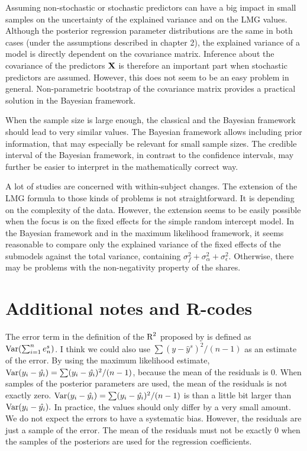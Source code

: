 \documentclass[11pt,a4paper,twoside]{book}\usepackage[]{graphicx}\usepackage[]{color}
\begin{document}
Assuming non-stochastic or stochastic predictors can have a big impact in small samples on the uncertainty of the explained variance and on the LMG values. Although the posterior regression parameter distributions are the same in both cases (under the assumptions described in chapter 2), the explained variance of a model is directly dependent on the covariance matrix. Inference about the covariance of the predictors ${\mathbf{X}}$ is therefore an important part when stochastic predictors are assumed. However, this does not seem to be an easy problem in general. Non-parametric bootstrap of the covariance matrix provides a practical solution in the Bayesian framework. 

 When the sample size is large enough, the classical and the Bayesian framework should lead to very similar values. The Bayesian framework allows including prior information, that may especially be relevant for small sample sizes. The credible interval of the Bayesian framework, in contrast to the confidence intervals, may further be easier to interpret in the mathematically correct way.
 
A lot of studies are concerned with within-subject changes. The extension of the LMG formula to those kinds of problems is not straightforward. It is depending on the complexity of the data. However, the extension seems to be easily possible when the focus is on the fixed effects for the simple random intercept model. In the Bayesian framework and in the maximum likelihood framework, it seems reasonable to compare only the explained variance of the fixed effects of the submodels against the total variance, containing $\sigma_{f}^2 + \sigma_{\alpha}^2 + \sigma_{\epsilon}^2$. Otherwise, there may be problems with the non-negativity property of the shares. 









\cleardoublepage

\appendix


\chapter{Additional notes and R-codes}

The error term in the definition of the $\text{R}^2$ proposed by \cite{Gelman2017} is defined as $\operatorname{Var}(\sum_{i=1}^{n}e^s_{n})$. I think we could also use $ \sum(y - \hat{y}^s)^2/(n-1) $ as an estimate of the error. By using the maximum likelihood estimate,  $\operatorname{Var}(y_{i} - \hat{y_{i}}) = \sum (y_{i} - \hat{y_{i}})^2/ (n-1) $,  because the mean of the residuals is 0. When  samples of the posterior parameters are used, the mean of the residuals is not exactly zero. $\operatorname{Var}(y_{i} - \hat{y_{i}}) = \sum (y_{i} - \hat{y_{i}})^2/ (n-1) $ is than a little bit larger than $\operatorname{Var}(y_{i} - \hat{y_{i}}). $ In practice, the values should only differ by a very small amount. We do not expect the errors to have a systematic bias. However, the residuals are just a sample of the error. The mean of the residuals must not be exactly 0 when the samples of the posteriors are used for the regression coefficients.   
\end{document}
